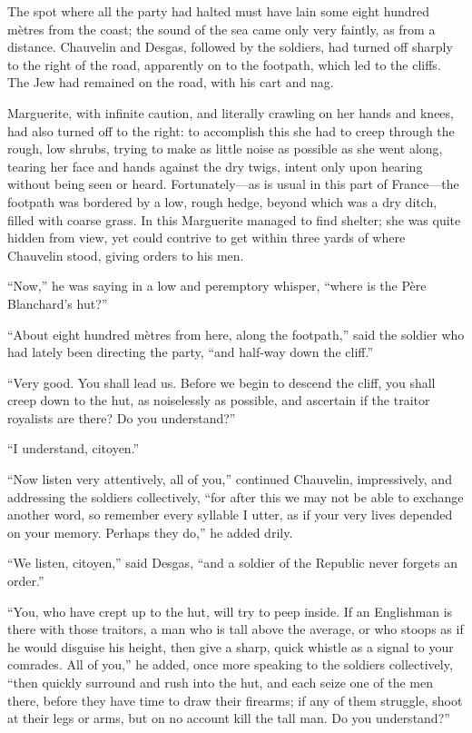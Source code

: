The spot where all the party had halted must have lain some eight hundred mètres from the coast; the sound of the sea came only very faintly, as from a distance. Chauvelin and Desgas, followed by the soldiers, had turned off sharply to the right of the road, apparently on to the footpath, which led to the cliffs. The Jew had remained on the road, with his cart and nag.

Marguerite, with infinite caution, and literally crawling on her hands and knees, had also turned off to the right: to accomplish this she had to creep through the rough, low shrubs, trying to make as little noise as possible as she went along, tearing her face and hands against the dry twigs, intent only upon hearing without being seen or heard. Fortunately---as is usual in this part of France---the footpath was bordered by a low, rough hedge, beyond which was a dry ditch, filled with coarse grass. In this Marguerite managed to find shelter; she was quite hidden from view, yet could contrive to get within three yards of where Chauvelin stood, giving orders to his men.

\enquote{Now,} he was saying in a low and peremptory whisper, \enquote{where is the Père Blanchard's hut?}

\enquote{About eight hundred mètres from here, along the footpath,} said the soldier who had lately been directing the party, \enquote{and half-way down the cliff.}

\enquote{Very good. You shall lead us. Before we begin to descend the cliff, you shall creep down to the hut, as noiselessly as possible, and ascertain if the traitor royalists are there? Do you understand?}

\enquote{I understand, citoyen.}

\enquote{Now listen very attentively, all of you,} continued Chauvelin, impressively, and addressing the soldiers collectively, \enquote{for after this we may not be able to exchange another word, so remember every syllable I utter, as if your very lives depended on your memory. Perhaps they do,} he added drily.

\enquote{We listen, citoyen,} said Desgas, \enquote{and a soldier of the Republic never forgets an order.}

\enquote{You, who have crept up to the hut, will try to peep inside. If an Englishman is there with those traitors, a man who is tall above the average, or who stoops as if he would disguise his height, then give a sharp, quick whistle as a signal to your comrades. All of you,} he added, once more speaking to the soldiers collectively, \enquote{then quickly surround and rush into the hut, and each seize one of the men there, before they have time to draw their firearms; if any of them struggle, shoot at their legs or arms, but on no account kill the tall man. Do you understand?}

